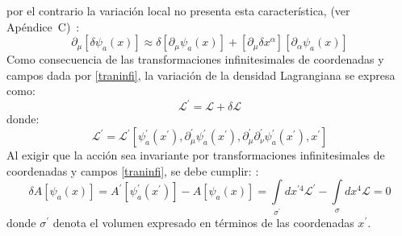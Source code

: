\documentclass[a4paper,12pt]{article}
\begin{document}
por el contrario la variación local no presenta esta característica, (ver \mbox{Apéndice C) \cite{noether,greiner}:}
\begin{equation}
\partial_{\mu}[\delta\psi_a(x)]\approx\delta[\partial_{\mu}\psi_a(x)]+[\partial_{\mu} \delta x^{\alpha}][\partial_{\alpha}\psi_a(x)]
\end{equation}
Como consecuencia de las transformaciones infinitesimales de coordenadas y campos dada por \eqref{traninfi}, la variación de la densidad Lagrangiana se expresa como:
\begin{equation}
\mathscr{L}^{'}=\mathscr{L}+\delta\mathscr{L}
\label{varlangr}
\end{equation}
donde:
\begin{equation}
\mathscr{L}^{'}=\mathscr{L}^{'}[\psi_a^{'}(x^{'}),\partial_{\mu}^{'}\psi_a^{'}(x^{'}),\partial_{\mu}^{'}\partial_{\nu}^{'}\psi_a^{'}(x^{'}),x^{'}] 
\end{equation}
Al exigir que la acción sea invariante por transformaciones infinitesimales de coordenadas y campos \eqref{traninfi}, se debe cumplir: \cite{general,noether,greiner}:
\begin{equation}
\delta A[\psi_a (x)]=A^{'}[\psi_a^{'}(x^{'})]-A[\psi_a(x)]=\int\limits_{\sigma^{'}}dx^{'4}\mathscr{L}^{'}-\int\limits_{\sigma}dx^4\mathscr{L}=0 
\label{acno} 
\end{equation}
donde $\sigma^{'}$ denota el volumen expresado en términos de las coordenadas $x^{'}$.
\\
  
\end{document}
